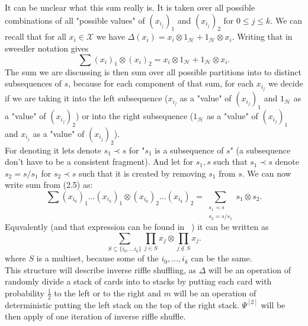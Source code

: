 \documentclass[a4paper, 12pt]{report}
\begin{document}
It can be unclear what this sum really is. It is taken over all possible combinations of all "possible 
values" of $(x_{i_j})_1$ and $(x_{i_j})_2$ for $ 0 \leq j \leq k$. We can recall that for all 
$x_i \in \mathcal{X}$ we 
have $\Delta(x_i) = x_i \otimes 1_\mathcal{H} + 1_\mathcal{H} \otimes x_i$. Writing that in sweedler 
notation gives
\begin{equation*}
\sum(x_i)_1 \otimes (x_i)_2 = x_i \otimes 1_\mathcal{H} + 1_\mathcal{H} \otimes x_i.
\end{equation*}
The sum we are discussing is then sum over all possible partitions into to distinct subsequences of $s$, 
because for each component of that sum, for each $x_{i_j}$ we decide if we are taking it into the left 
subsequence ($x_{i_j}$ as a "value" of $(x_{i_j})_1$ and $1_\mathcal{H}$ as a "value" of $(x_{i_j})_2$) or 
into the right subsequence ($1_\mathcal{H}$ as a "value" of $(x_{i_j})_1$ and $x_{i_j}$ as a "value" of 
$(x_{i_j})_2$).
\\ For denoting it lets denote $s_1 \prec s$ for "$s_1$ is a subsequence of $s$" (a subsequence don't have 
to be a consistent fragment). And let for $s_1, s$ 
such that $s_1 \prec s$ denote $s_2 = s / s_1$ for $s_2 \prec s$ such that it is created by removing 
$s_1$ from $s$. We can now write sum from (2.5) as:
\begin{equation*}
\sum (x_{i_0})_1 \dots (x_{i_k})_1 \otimes (x_{i_0})_2 \dots (x_{i_k})_2 =
\sum_{\substack{s_1 \prec s \\ s_2 = s / s_1}} s_1 \otimes s_2.
\end{equation*}
Equvalently (and that expression can be found in ~\cite{Diaconis2014}) it can be written as
\begin{equation*}
\sum_{S \subseteq \{ i_0, \dots i_k \} } \prod_{j \in S} x_j \otimes \prod_{j \notin S} x_j.
\end{equation*}
where $S$ is a multiset, because some of the $i_0, \dots, i_k$ can be the same. \\
\indent This structure will describe inverse riffle shuffling, as $\Delta$ will be an operation of 
randomly divide a stack of cards into to stacks by putting each card with probability $\frac{1}{2}$ to 
the left or to the right and $m$ will be an operation of deterministic putting the left stack on the top 
of the right stack. $\Psi^{[2]}$ will be then apply of one iteration of inverse riffle shuffle.
\end{document}
